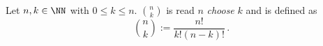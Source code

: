 \guard



\begin{defn}
\label{defn:choose}
  Let $n,k\in\NN$ with $0\leq k\leq n$.
  ${n \choose k}$ is read $n$ \emph{choose} $k$ and is defined as
  \[ {n \choose k} := \frac{ n! }{ k!(n-k)! }\,.\]
\end{defn}
